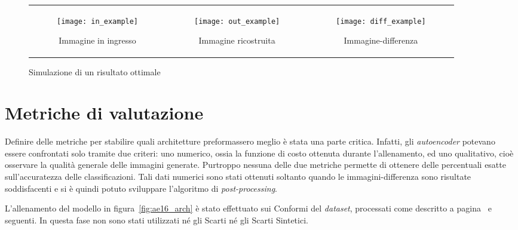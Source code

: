 \begin{figure}[ht] %
  \begin{center}
    \begin{tabular}{ccc}

      \begin{subfigure}{.3\linewidth}
        \centering\texttt{[image: in\_example]}
        \caption{Immagine in ingresso}
        \label{fig:obbiettivo_in}
      \end{subfigure} &

      \begin{subfigure}{.3\linewidth}
        \centering\texttt{[image: out\_example]}

        \caption{Immagine ricostruita}
        \label{fig:obbiettivo_out}
      \end{subfigure} &

      \begin{subfigure}{.3\linewidth}
        \centering\texttt{[image: diff\_example]}
        \caption{Immagine-differenza}
        \label{fig:obbiettivo_diff}
      \end{subfigure}

    \end{tabular}
    \caption{Simulazione di un risultato ottimale}
    \label{fig:obbiettivo_in_out_diff}
  \end{center}
\end{figure}

\section{Metriche di valutazione}
Definire delle metriche per stabilire quali architetture preformassero meglio è stata una parte critica.
Infatti, gli \textit{autoencoder} potevano essere confrontati solo tramite due criteri: uno numerico, ossia la funzione di costo ottenuta durante l'allenamento, ed uno qualitativo, cioè osservare la qualità generale delle immagini generate.
Purtroppo nessuna delle due metriche permette di ottenere delle percentuali esatte sull'accuratezza delle classificazioni.
Tali dati numerici sono stati ottenuti soltanto quando le immagini-differenza sono risultate soddisfacenti e si è quindi potuto sviluppare l'algoritmo di \textit{post-processing}. 

L'allenamento del modello in figura~\ref{fig:ae16_arch} è stato effettuato sui Conformi del \textit{dataset}, processati come descritto a pagina~\pageref{prep} e seguenti.
In questa fase non sono stati utilizzati né gli Scarti né gli Scarti Sintetici.

